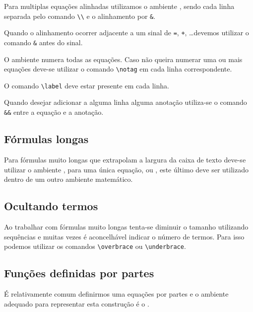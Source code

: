 Para multiplas equações alinhadas utilizamos o ambiente , sendo cada linha separada pelo comando \lstinline!\\! e o alinhamento por \lstinline!&!. \\

Quando o alinhamento ocorrer adjacente a um sinal de \lstinline!=!, \lstinline!+!, \dots devemos utilizar o comando \lstinline!&! antes do sinal.

O ambiente  numera todas as equações. Caso não queira numerar uma ou mais equações deve-se utilizar o comando \lstinline!\notag! em cada linha correspondente.

O comando \lstinline!\label! deve estar presente em cada linha.

Quando desejar adicionar a alguma linha alguma anotação utiliza-se o comando \lstinline!&&! entre a equação e a anotação. \\

\subsection{Fórmulas longas}
Para fórmulas muito longas que extrapolam a largura da caixa de texto deve-se utilizar o ambiente , para uma \'{u}nica equa\c{c}\~{a}o, ou , este \'{u}ltimo deve ser utilizado dentro de um outro ambiente matem\'{a}tico.

\subsection{Ocultando termos}
Ao trabalhar com fórmulas muito longas tenta-se diminuir o tamanho utilizando sequências e muitas vezes é aconcelhável indicar o número de termos. Para isso podemos utilizar os comandos \lstinline!\overbrace! ou \lstinline!\underbrace!. \\

\subsection{Funções definidas por partes}
É relativamente comum definirmos uma equações por partes e o ambiente adequado para representar esta construção é o . \\

